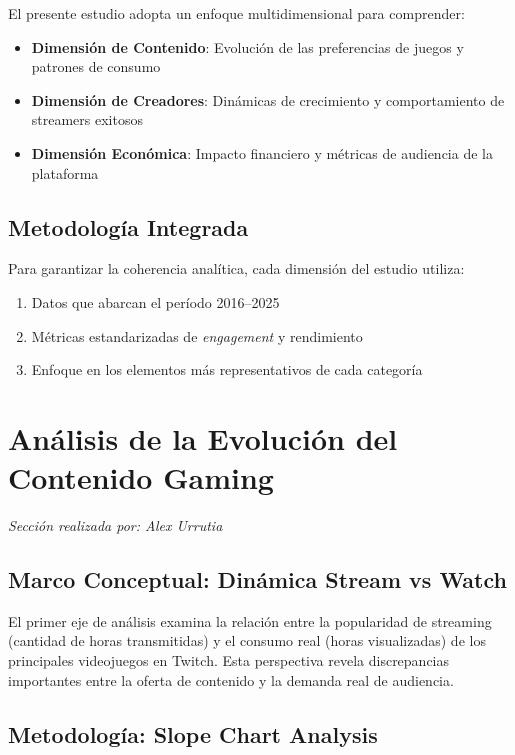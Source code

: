 \documentclass[12pt,a4paper]{article}
\begin{document}
El presente estudio adopta un enfoque multidimensional para comprender: 

\begin{itemize}
    \item \textbf{Dimensión de Contenido}: Evolución de las preferencias de juegos y patrones de consumo 
    \item \textbf{Dimensión de Creadores}: Dinámicas de crecimiento y comportamiento de streamers exitosos 
    \item \textbf{Dimensión Económica}: Impacto financiero y métricas de audiencia de la plataforma 
\end{itemize}

\subsection{Metodología Integrada} 

Para garantizar la coherencia analítica, cada dimensión del estudio utiliza: 
\begin{enumerate}
    \item Datos que abarcan el período 2016--2025 
    \item Métricas estandarizadas de \textit{engagement} y rendimiento 
    \item Enfoque en los elementos más representativos de cada categoría
\end{enumerate}
\newpage
\section{Análisis de la Evolución del Contenido Gaming} 
\textit{Sección realizada por: Alex Urrutia}

\subsection{Marco Conceptual: Dinámica Stream vs Watch} 

El primer eje de análisis examina la relación entre la popularidad de streaming (cantidad de horas transmitidas) y el consumo real (horas visualizadas) de los principales videojuegos en Twitch. Esta perspectiva revela discrepancias importantes entre la oferta de contenido y la demanda real de audiencia.

\subsection{Metodología: Slope Chart Analysis}
\end{document}
